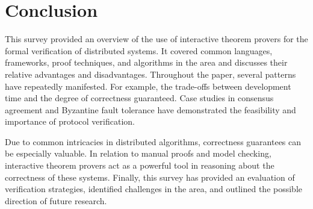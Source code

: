 \documentclass[acmsmall,screen,review]{acmart}
\begin{document}
\section{Conclusion}

  This survey provided an overview of the use of interactive theorem provers for the formal verification of distributed systems.
  It covered common languages, frameworks, proof techniques, and algorithms in the area and discusses their relative advantages and disadvantages.
  Throughout the paper, several patterns have repeatedly manifested.
  For example, the trade-offs between development time and the degree of correctness guaranteed.
  Case studies in consensus agreement and Byzantine fault tolerance have demonstrated the feasibility and importance of protocol verification.

  Due to common intricacies in distributed algorithms, correctness guarantees can be especially valuable.
  In relation to manual proofs and model checking, interactive theorem provers act as a powerful tool in reasoning about the correctness of these systems.
  Finally, this survey has provided an evaluation of verification strategies, identified challenges in the area, and outlined the possible direction of future research.





\end{document}
